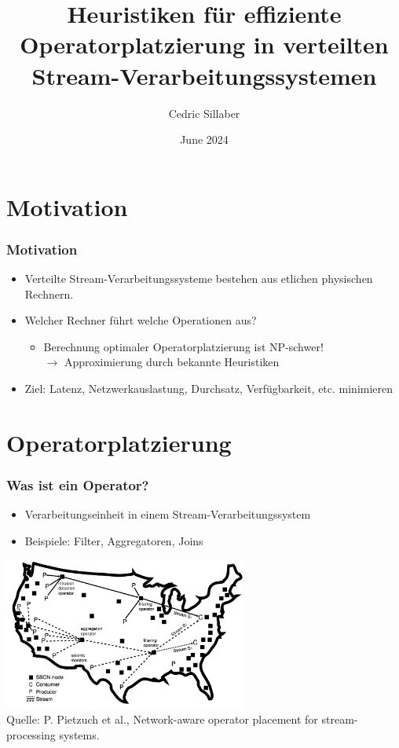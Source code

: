 \documentclass{beamer}
\title{Heuristiken für effiziente Operatorplatzierung in verteilten Stream-Verarbeitungssystemen}
\author{Cedric Sillaber}
\date{June 2024}
\begin{document}
\frame{\titlepage}




\section{Motivation}
\begin{frame}
\frametitle{Motivation}
\begin{itemize}
    \item Verteilte Stream-Verarbeitungssysteme bestehen aus etlichen physischen Rechnern.
    \item Welcher Rechner führt welche Operationen aus?
    \begin{itemize}
        \item Berechnung optimaler Operatorplatzierung ist NP-schwer! \\
        $\rightarrow$ Approximierung durch bekannte Heuristiken
    \end{itemize}
    \item Ziel: Latenz, Netzwerkauslastung, Durchsatz, Verfügbarkeit, etc. minimieren
\end{itemize}
\end{frame}


\section{Operatorplatzierung}
\begin{frame}
\frametitle{Was ist ein Operator?}
\begin{itemize}
    \item Verarbeitungseinheit in einem Stream-Verarbeitungssystem
    \item Beispiele: Filter, Aggregatoren, Joins
\end{itemize}
\begin{center}
    \includegraphics[width=0.6\textwidth]{res/SVS.png} \\
    \tiny \color{gray} Quelle: P. Pietzuch et al., Network-aware operator placement for stream-processing systems.
\end{center}
\end{frame}
\end{document}

